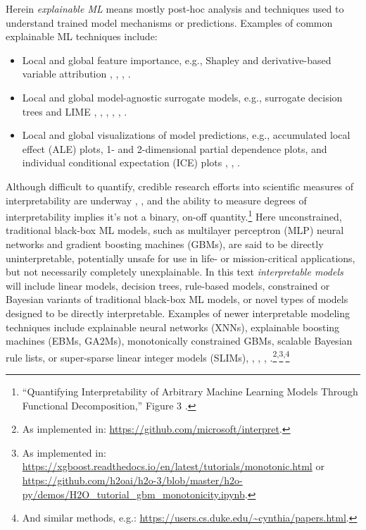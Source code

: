\documentclass{article}
\begin{document}
Herein \textit{explainable ML} means mostly post-hoc analysis and techniques used to understand trained model mechanisms or predictions. Examples of common explainable ML techniques include:

\begin{itemize}
\item Local and global feature importance, e.g., Shapley and derivative-based variable attribution \cite{grad_attr} \cite{keinan2004fair}, \cite{shapley}, \cite{shapley1988shapley}, \cite{kononenko2010efficient}.
\item Local and global model-agnostic surrogate models, e.g., surrogate decision trees and LIME \cite{dt_surrogate2}, \cite{viper}, \cite{dt_surrogate1}, \cite{lime-sup}, \cite{lime}, \cite{wf_xnn}. 
\item Local and global visualizations of model predictions, e.g., accumulated local effect (ALE) plots, 1- and 2-dimensional partial dependence plots, and individual conditional expectation (ICE) plots \cite{ale_plot}, \cite{esl}, \cite{ice_plots}.
\end{itemize}  

Although difficult to quantify, credible research efforts into scientific measures of interpretability are underway \cite{friedler2019assessing}, \cite{molnar2019quantifying}, and the ability to measure degrees of interpretability implies it's not a binary, on-off quantity.\footnote{``Quantifying Interpretability of Arbitrary Machine Learning Models Through Functional Decomposition,'' Figure 3 \cite{molnar2019quantifying}.} Here unconstrained, traditional black-box ML models, such as multilayer perceptron (MLP) neural networks and gradient boosting machines (GBMs), are said to be directly uninterpretable, potentially unsafe for use in life- or mission-critical applications, but not necessarily completely unexplainable. In this text \textit{interpretable models} will include linear models, decision trees, rule-based models, constrained or Bayesian variants of traditional black-box ML models, or novel types of models designed to be directly interpretable. Examples of newer interpretable modeling techniques include explainable neural networks (XNNs), explainable boosting machines (EBMs, GA2Ms), monotonically constrained GBMs, scalable Bayesian rule lists, or super-sparse linear integer models (SLIMs), \cite{ga2m}, \cite{slim}, \cite{wf_xnn}, \cite{sbrl}.\footnote{As implemented in: \url{https://github.com/microsoft/interpret}.}\textsuperscript{,}\footnote{As implemented in: \url{https://xgboost.readthedocs.io/en/latest/tutorials/monotonic.html} or \url{https://github.com/h2oai/h2o-3/blob/master/h2o-py/demos/H2O_tutorial_gbm_monotonicity.ipynb}.}\textsuperscript{,}\footnote{And similar methods, e.g.: \url{https://users.cs.duke.edu/~cynthia/papers.html}.}
\end{document}
